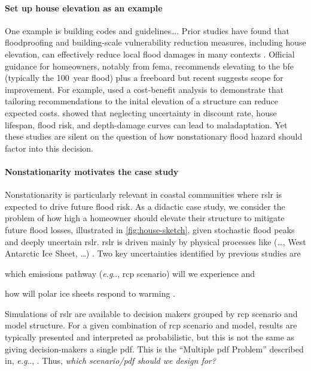 \documentclass[12pt]{article}
\makeatletter
\DeclareRobustCommand\onedot{\futurelet\@let@token\@onedot}
\def\@onedot{\ifx\@let@token.\else.\null\fi\xspace}
\def\eg{\emph{e.g}\onedot} \def\Eg{\emph{E.g}\onedot}
\makeatother
\begin{document}
\paragraph{Set up house elevation as an example}
One example is building codes and guidelines\ldots.
Prior studies have found that floodproofing and building-scale vulnerability reduction measures, including house elevation, can effectively reduce local flood damages in many contexts \citep{demoel_reducing:2014,deruig_building:2020,kreibich_building:2005,slotter_floodproofing:2020,Rozer:2016dn,mobley_mitigation:2020,aerts_cost:2018}.
Official guidance for homeowners, notably from \gls{fema}, recommends elevating to the \gls{bfe} (typically the \SI{100}{year} flood) plus a freeboard \citep{fema_retrofitting:2014,asce_24-14:2015,fema_retrofitting:2014} but recent suggests scope for improvement.
For example, \citet{xian_elevation:2017} used a cost-benefit analysis to demonstrate that tailoring recommendations to the inital elevation of a structure can reduce expected costs.
\citet{zarekarizi_suboptimal:2020} showed that neglecting uncertainty in discount rate, house lifespan, flood risk, and depth-damage curves can lead to maladaptation.
Yet these studies are silent on the question of how nonstationary flood hazard should factor into this decision.

\paragraph{Nonstationarity motivates the case study}
Nonstationarity is particularly relevant in coastal communities where \gls{rslr} is expected to drive future flood risk.
As a didactic case study, we consider the problem of how high a homeowner should elevate their structure to mitigate future flood losses, illustrated in \cref{fig:house-sketch}, given stochastic flood peaks and deeply uncertain \gls{rslr}.
\Gls{rslr} is driven mainly by physical processes like (\ldots, West Antarctic Ice Sheet, \ldots) \citep{kopp_probabilistic:2014,kopp_evolving:2017}.
Two key uncertainties identified by previous studies are
\begin{enumerate*}[label=(\roman*)]
    \item which emissions pathway (\eg, \gls{rcp} scenario) will we experience and
    \item how will polar ice sheets respond to warming \citep{wong_brick0.2:2017,ruckert_coastal:2019,wong_nola:2017,deconto_antarctica:2016}.
\end{enumerate*}
Simulations of \gls{rslr} are available to decision makers grouped by \gls{rcp} scenario and model structure.
For a given combination of \gls{rcp} scenario and model, results are typically presented and interpreted as probabilistic, but this is not the same as giving decision-makers a single \gls{pdf}.
This is the ``Multiple \gls{pdf} Problem'' described in, \eg, \citet{sharma_rcp:2021}.
Thus, \emph{which scenario/\gls{pdf} should we design for?}
\end{document}

